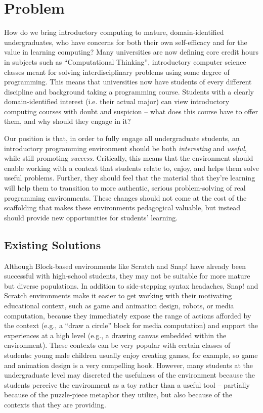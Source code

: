 \documentclass{sig-alternate}
\begin{document}
\section{Problem}

How do we bring introductory computing to mature, domain-identified undergraduates, who have concerns for both their own self-efficacy and for the value in learning computing?
Many universities are now defining core credit hours in subjects such as ``Computational Thinking'', introductory computer science classes meant for solving interdisciplinary problems using some degree of programming.
This means that universities now have students of every different discipline and background taking a programming course.
Students with a clearly domain-identified interest (i.e. their actual major) can view introductory computing courses with doubt and suspicion -- what does this course have to offer them, and why should they engage in it?

Our position is that, in order to fully engage all undergraduate students, an introductory programming environment should be both \textit{interesting} and \textit{useful}, while still promoting \textit{success}.
Critically, this means that the environment should enable working with a context that students relate to, enjoy, and helps them solve useful problems.
Further, they should feel that the material that they're learning will help them to transition to more authentic, serious problem-solving of real programming environments.
These changes should not come at the cost of the scaffolding that makes these environments pedagogical valuable, but instead should provide new opportunities for students' learning.

\subsection{Existing Solutions}

Although Block-based environments like Scratch and Snap! have already been successful with high-school students, they may not be suitable for more mature but diverse populations.
In addition to side-stepping syntax headaches, Snap! and Scratch environments make it easier to get working with their motivating educational context, such as game and animation design, robots, or media computation, because they immediately expose the range of actions afforded by the context (e.g., a ``draw a circle'' block for media computation) and support the experiences at a high level (e.g., a drawing canvas embedded within the environment).
These contexts can be very popular with certain classes of students: young male children usually enjoy creating games, for example, so game and animation design is a very compelling hook.
However, many students at the undergraduate level may discreted the usefulness of the environment because the students perceive the environment as a toy rather than a useful tool -- partially because of the puzzle-piece metaphor they utilize, but also because of the contexts that they are providing.
\end{document}
